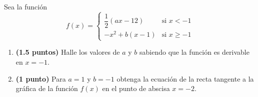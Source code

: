 
Sea la función
\[
f(x)=\begin{cases}
\dfrac{1}{2}(ax-12) & \text{si }x<-1\\[4pt]
-x^2+b(x-1) & \text{si }x\geq-1
\end{cases}
\]
\begin{enumerate}[label=\alph*)]
\item \textbf{(1.5 puntos)} Halle los valores de $a$ y $b$ sabiendo que la función es derivable en $x=-1$.
\item \textbf{(1 punto)} Para $a=1$ y $b=-1$ obtenga la ecuación de la recta tangente a la gráfica de la función $f(x)$ en el punto de abscisa $x=-2$.
\end{enumerate}
